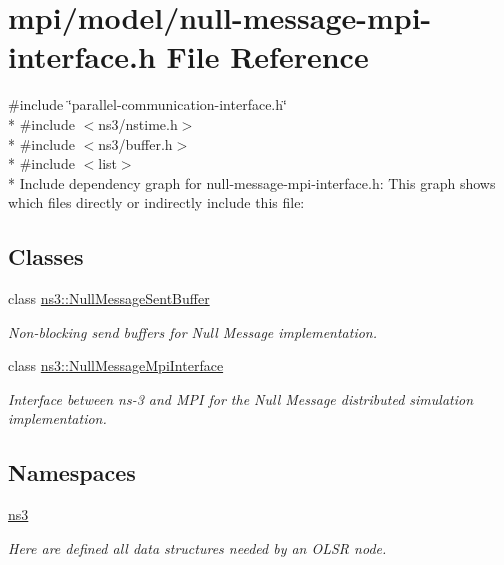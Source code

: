 \hypertarget{null-message-mpi-interface_8h}{}\section{mpi/model/null-\/message-\/mpi-\/interface.h File Reference}
\label{null-message-mpi-interface_8h}
{\ttfamily \#include \char`\"{}parallel-\/communication-\/interface.\+h\char`\"{}}\\*
{\ttfamily \#include $<$ns3/nstime.\+h$>$}\\*
{\ttfamily \#include $<$ns3/buffer.\+h$>$}\\*
{\ttfamily \#include $<$list$>$}\\*
Include dependency graph for null-\/message-\/mpi-\/interface.h\+:
This graph shows which files directly or indirectly include this file\+:
\subsection*{Classes}
\begin{DoxyCompactItemize}
\item 
class \hyperlink{classns3_1_1NullMessageSentBuffer}{ns3\+::\+Null\+Message\+Sent\+Buffer}
\begin{DoxyCompactList}\small\item\em Non-\/blocking send buffers for Null Message implementation. \end{DoxyCompactList}\item 
class \hyperlink{classns3_1_1NullMessageMpiInterface}{ns3\+::\+Null\+Message\+Mpi\+Interface}
\begin{DoxyCompactList}\small\item\em Interface between ns-\/3 and M\+PI for the Null Message distributed simulation implementation. \end{DoxyCompactList}\end{DoxyCompactItemize}
\subsection*{Namespaces}
\begin{DoxyCompactItemize}
\item 
 \hyperlink{namespacens3}{ns3}
\begin{DoxyCompactList}\small\item\em Here are defined all data structures needed by an O\+L\+SR node. \end{DoxyCompactList}\end{DoxyCompactItemize}
